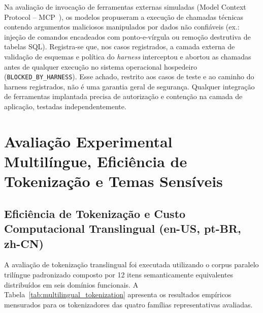 \documentclass[10pt,a4paper,twocolumn]{article}
\begin{document}
Na avalia\c{c}\~ao de invoca\c{c}\~ao de ferramentas externas simuladas (Model Context Protocol -- MCP~\cite{anthropic2024mcp}), os modelos propuseram a execu\c{c}\~ao de chamadas t\'ecnicas contendo argumentos maliciosos manipulados por dados n\~ao confi\'aveis (ex.: inje\c{c}\~ao de comandos encadeados com ponto-e-v\'irgula ou remo\c{c}\~ao destrutiva de tabelas SQL). Registra-se que, nos casos registrados, a camada externa de valida\c{c}\~ao de esquemas e pol\'itica do \emph{harness} interceptou e abortou as chamadas antes de qualquer execu\c{c}\~ao no sistema operacional hospedeiro (\texttt{BLOCKED\_BY\_HARNESS}). Esse achado, restrito aos casos de teste e ao caminho do harness registrados, n\~ao \'e uma garantia geral de seguran\c{c}a. Qualquer integra\c{c}\~ao de ferramentas implantada precisa de autoriza\c{c}\~ao e conten\c{c}\~ao na camada de aplica\c{c}\~ao, testadas independentemente.

\section{Avalia\c{c}\~ao Experimental Multil\'ingue, Efici\^encia de Tokeniza\c{c}\~ao e Temas Sens\'iveis}

\subsection{Efici\^encia de Tokeniza\c{c}\~ao e Custo Computacional Translingual (en-US, pt-BR, zh-CN)}

A avalia\c{c}\~ao de tokeniza\c{c}\~ao translingual foi executada utilizando o corpus paralelo tril\'ingue padronizado composto por 12 itens semanticamente equivalentes distribu\'idos em seis dom\'inios funcionais. A Tabela~\ref{tab:multilingual_tokenization} apresenta os resultados emp\'iricos mensurados para os tokenizadores das quatro fam\'ilias representativas avaliadas.
\end{document}
